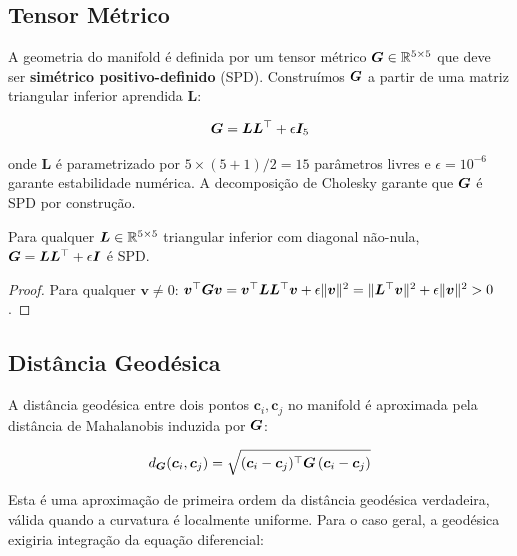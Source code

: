 \subsection{Tensor M\'etrico}

A geometria do manifold \'e definida por um tensor m\'etrico
$\bm{G} \in \mathbb{R}^{5 \times 5}$ que deve ser \textbf{sim\'etrico positivo-definido}
(SPD). Constru\'imos $\bm{G}$ a partir de uma matriz triangular inferior
aprendida $\bm{L}$:

\begin{equation}
    \bm{G} = \bm{L}\bm{L}^\top + \epsilon \bm{I}_5
    \label{eq:metric_spd}
\end{equation}

onde $\bm{L}$ \'e parametrizado por $5 \times (5+1) / 2 = 15$ par\^ametros
livres e $\epsilon = 10^{-6}$ garante estabilidade num\'erica. A
decomposi\c{c}\~ao de Cholesky garante que $\bm{G}$ \'e SPD por constru\c{c}\~ao.

\begin{proposition}
Para qualquer $\bm{L} \in \mathbb{R}^{5 \times 5}$ triangular inferior com diagonal
n\~ao-nula, $\bm{G} = \bm{L}\bm{L}^\top + \epsilon \bm{I}$ \'e SPD.
\end{proposition}

\begin{proof}
Para qualquer $\bm{v} \neq 0$:
$\bm{v}^\top \bm{G} \bm{v} = \bm{v}^\top \bm{L}\bm{L}^\top \bm{v} + \epsilon \|\bm{v}\|^2
= \|\bm{L}^\top \bm{v}\|^2 + \epsilon \|\bm{v}\|^2 > 0$.
\end{proof}

\subsection{Dist\^ancia Geod\'esica}

A dist\^ancia geod\'esica entre dois pontos $\bm{c}_i, \bm{c}_j$ no manifold \'e
aproximada pela dist\^ancia de Mahalanobis induzida por $\bm{G}$:

\begin{equation}
    d_{\bm{G}}(\bm{c}_i, \bm{c}_j) = \sqrt{(\bm{c}_i - \bm{c}_j)^\top \bm{G}\, (\bm{c}_i - \bm{c}_j)}
    \label{eq:geodesic}
\end{equation}

Esta \'e uma aproxima\c{c}\~ao de primeira ordem da dist\^ancia geod\'esica
verdadeira, v\'alida quando a curvatura \'e localmente uniforme. Para o caso
geral, a geod\'esica exigiria integra\c{c}\~ao da equa\c{c}\~ao diferencial:

